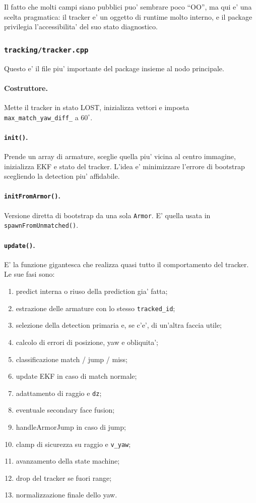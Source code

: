 \documentclass[11pt,a4paper]{article}
\newcommand{\code}[1]{\texttt{#1}}
\begin{document}
Il fatto che molti campi siano pubblici puo' sembrare poco ``OO'', ma qui e' una scelta pragmatica: il tracker e' un oggetto di runtime molto interno, e il package privilegia l'accessibilita' del suo stato diagnostico.

\subsubsection{\code{tracking/tracker.cpp}}

Questo e' il file piu' importante del package insieme al nodo principale.

\paragraph{Costruttore.}
Mette il tracker in stato LOST, inizializza vettori e imposta \code{max\_match\_yaw\_diff\_} a \(60^\circ\).

\paragraph{\code{init()}.}
Prende un array di armature, sceglie quella piu' vicina al centro immagine, inizializza EKF e stato del tracker. L'idea e' minimizzare l'errore di bootstrap scegliendo la detection piu' affidabile.

\paragraph{\code{initFromArmor()}.}
Versione diretta di bootstrap da una sola \code{Armor}. E' quella usata in \code{spawnFromUnmatched()}.

\paragraph{\code{update()}.}
E' la funzione gigantesca che realizza quasi tutto il comportamento del tracker. Le sue fasi sono:
\begin{enumerate}[leftmargin=1.4em]
  \item predict interna o riuso della prediction gia' fatta;
  \item estrazione delle armature con lo stesso \code{tracked\_id};
  \item selezione della detection primaria e, se c'e', di un'altra faccia utile;
  \item calcolo di errori di posizione, yaw e obliquita';
  \item classificazione match / jump / miss;
  \item update EKF in caso di match normale;
  \item adattamento di raggio e \code{dz};
  \item eventuale secondary face fusion;
  \item handleArmorJump in caso di jump;
  \item clamp di sicurezza su raggio e \code{v\_yaw};
  \item avanzamento della state machine;
  \item drop del tracker se fuori range;
  \item normalizzazione finale dello yaw.
\end{enumerate}
\end{document}
